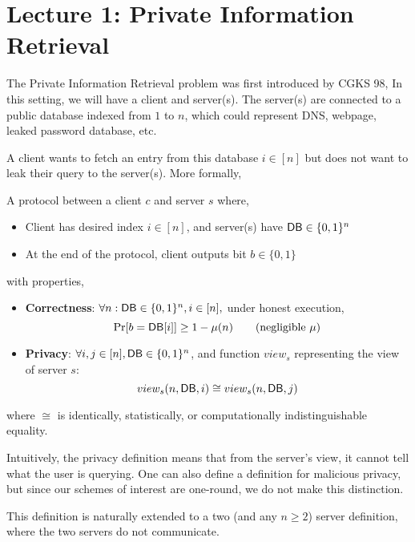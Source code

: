 \newcommand{\FHE}{\ensuremath{{\sf FHE}}}
\newcommand{\Gen}{\ensuremath{{\sf Gen}}}
\newcommand{\Eval}{\ensuremath{{\sf Eval}}}
\newcommand{\Enc}{\ensuremath{{\sf Enc}}}
\newcommand{\Dec}{\ensuremath{{\sf Dec}}}
\newcommand{\DB}{\ensuremath{{\sf DB}}}


\section{Lecture 1: Private Information Retrieval}
The Private Information Retrieval problem was first introduced by CGKS 98, In this setting, we will have a client and server(s). The server(s) are connected to a public database indexed from $1$ to $n$, which could represent DNS, webpage, leaked password database, etc.

A client wants to fetch an entry from this database $i \in [n]$ but does not want to leak their query to the server(s). More formally,
\begin{definition}
A protocol between a client $c$ and server $s$ where,
\begin{itemize}
	\item Client has desired index $i \in [n]$, and server(s) have $\DB \in \{0,1\}^n$
	\item At the end of the protocol, client outputs bit $b \in \{0,1\}$
\end{itemize}
with properties,
\begin{itemize}

	\item \textbf{Correctness}: $\forall n: \DB \in \{0,1\}^n, i \in [n],$ under honest execution, 
	\[\Pr[b = \DB[i]] \geq 1 - \mu(n) \tag{negligible $\mu$}\]
	
	\item \textbf{Privacy}: $\forall i,j \in [n], \DB  \in \{0,1\}^n$, and function $view_{s}$ representing the view of server $s$:
	\[view_s(n,\DB,i) \cong view_s(n,\DB,j)\]
\end{itemize}
where $\cong$ is identically, statistically, or computationally indistinguishable equality.
\end{definition}
Intuitively, the privacy definition means that from the server's view, it cannot tell what the user is querying. One can also define a definition for malicious privacy, but since our schemes of interest are one-round, we do not make this distinction.

This definition is naturally extended to a two (and any $n \geq 2$) server definition, where the two servers do not communicate.

